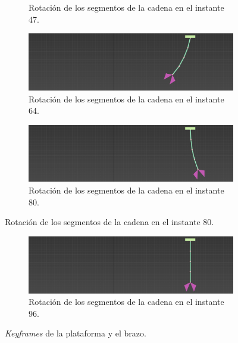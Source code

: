 \documentclass{article}
\begin{document}
\begin{figure}[H]
\begin{subfigure}[H]{0.48\textwidth}
        \caption{Rotación de los segmentos de la cadena en el instante 47.}
    \end{subfigure}
    \par\bigskip
    \begin{subfigure}[H]{0.48\textwidth}
        \centering
        \includegraphics[width=\textwidth]{imagenes/Ejercicio4/keyframes/64.png}
        \caption{Rotación de los segmentos de la cadena en el instante 64.}
    \end{subfigure}
    \hfill
    \begin{subfigure}[H]{0.48\textwidth}
        \centering
        \includegraphics[width=\textwidth]{imagenes/Ejercicio4/keyframes/80.png}
        \caption{Rotación de los segmentos de la cadena en el instante 80.}
    \end{subfigure}
\end{figure}

\begin{figure}[H]\ContinuedFloat
    \centering
\begin{subfigure}[H]{0.48\textwidth}
    \centering
    \includegraphics[width=\textwidth]{imagenes/Ejercicio4/keyframes/96.png}
    \caption{Rotación de los segmentos de la cadena en el instante 96.}
\end{subfigure}
\caption{\textit{Keyframes} de la plataforma y el brazo.}
\end{figure}
\end{document}
